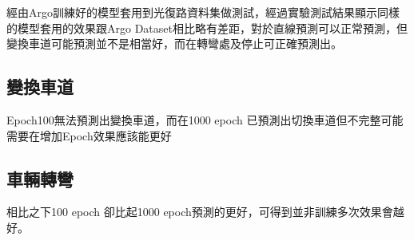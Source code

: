 \documentclass{article}
\begin{document}
\begin{itemize}
經由Argo訓練好的模型套用到光復路資料集做測試，經過實驗測試結果顯示同樣的模型套用的效果跟Argo Dataset相比略有差距，對於直線預測可以正常預測，但變換車道可能預測並不是相當好，而在轉彎處及停止可正確預測出。

\subsection{變換車道}
Epoch100無法預測出變換車道，而在1000 epoch 已預測出切換車道但不完整可能需要在增加Epoch效果應該能更好
\begin{figure}[H]
	\centering
\end{figure}

\subsection{車輛轉彎}
相比之下100 epoch 卻比起1000 epoch預測的更好，可得到並非訓練多次效果會越好。
\begin{figure}[H]
	\centering
\end{figure}


\end{itemize}
\end{document}

